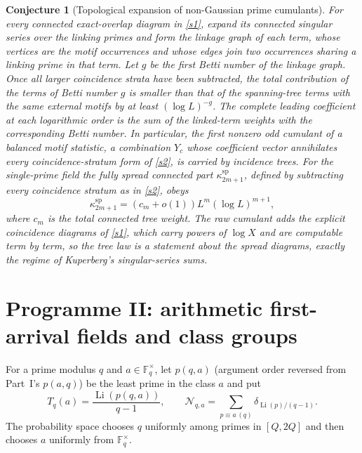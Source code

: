 \documentclass[11pt]{article}
\newtheorem{conjecture}{Conjecture}
\theoremstyle{definition}
\newcommand{\Li}{\operatorname{Li}}
\newcommand{\Fq}{\mathbb F}
\begin{document}
\begin{conjecture}[Topological expansion of non-Gaussian prime cumulants]\label{s5}
For every connected exact-overlap diagram in \cref{s1}, expand its connected singular series over the linking primes and form the linkage graph of each term, whose vertices are the motif occurrences and whose edges join two occurrences sharing a linking prime in that term.  Let $g$ be the first Betti number of the linkage graph.  Once all larger coincidence strata have been subtracted, the total contribution of the terms of Betti number $g$ is smaller than that of the spanning-tree terms with the same external motifs by at least $(\log L)^{-g}$.  The complete leading coefficient at each logarithmic order is the sum of the linked-term weights with the corresponding Betti number.  In
particular, the first nonzero odd cumulant of a balanced motif statistic, a
combination $Y_c$ whose coefficient vector annihilates every coincidence-stratum form
of \cref{s2}, is carried by
incidence trees.  For the single-prime field the fully spread connected part
$\kappa^{\mathrm{sp}}_{2m+1}$, defined by subtracting every coincidence stratum as in
\cref{s2}, obeys
\[
 \kappa^{\mathrm{sp}}_{2m+1}=(c_m+o(1))L^m(\log L)^{m+1},
\]
where $c_m$ is the total connected tree weight.  The raw cumulant adds the explicit
coincidence diagrams of \cref{s1}, which carry powers of $\log X$ and are computable
term by term, so the tree law is a statement about the spread diagrams, exactly the
regime of Kuperberg's singular-series sums.
\end{conjecture}

\section{Programme II: arithmetic first-arrival fields and class groups}

For a prime modulus $q$ and $a\in\Fq_q^\times$, let $p(q,a)$ (argument order reversed from Part~I's $p(a,q)$) be the least prime in the
class $a$ and put
\[
 T_q(a)=\frac{\Li(p(q,a))}{q-1},\qquad
 \mathcal N_{q,a}=\sum_{p\equiv a\, (q)}
 \delta_{\Li(p)/(q-1)}.
\]
The probability space chooses $q$ uniformly among primes in $[Q,2Q]$ and then chooses
$a$ uniformly from $\Fq_q^\times$.
\end{document}
